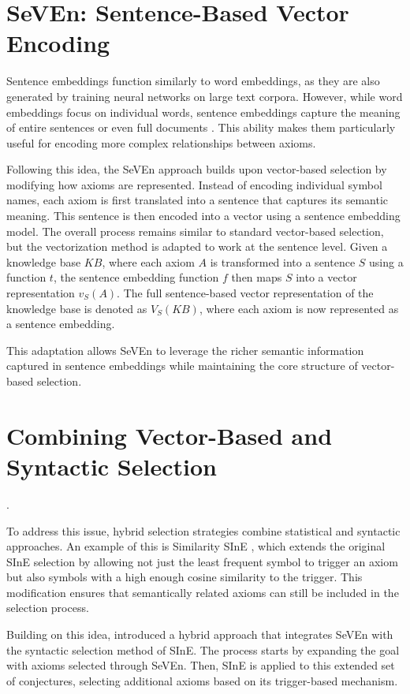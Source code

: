\documentclass[english,version-2020-11]{uzl-thesis}
\begin{document}
\section{SeVEn: Sentence-Based Vector Encoding}

Sentence embeddings function similarly to word embeddings, as they are also generated by training neural networks on large text corpora. However, while word embeddings focus on individual words, sentence embeddings capture the meaning of entire sentences or even full documents \cite{Kiros2015SkipThought}. This ability makes them particularly useful for encoding more complex relationships between axioms.

Following this idea, the SeVEn approach builds upon vector-based selection by modifying how axioms are represented. Instead of encoding individual symbol names, each axiom is first translated into a sentence that captures its semantic meaning. This sentence is then encoded into a vector using a sentence embedding model. The overall process remains similar to standard vector-based selection, but the vectorization method is adapted to work at the sentence level. Given a knowledge base \( KB \), where each axiom \( A \) is transformed into a sentence \( S \) using a function \( t \), the sentence embedding function \( f \) then maps \( S \) into a vector representation \( v_S(A) \). The full sentence-based vector representation of the knowledge base is denoted as \( V_S(KB) \), where each axiom is now represented as a sentence embedding.

This adaptation allows SeVEn to leverage the richer semantic information captured in sentence embeddings while maintaining the core structure of vector-based selection.

\section{Combining Vector-Based and Syntactic Selection}.

To address this issue, hybrid selection strategies combine statistical and syntactic approaches. An example of this is Similarity SInE \cite{Furbach2019WordEmbeddings}, which extends the original SInE selection by allowing not just the least frequent symbol to trigger an axiom but also symbols with a high enough cosine similarity to the trigger. This modification ensures that semantically related axioms can still be included in the selection process.

Building on this idea, \cite{Schon2023} introduced a hybrid approach that integrates SeVEn with the syntactic selection method of SInE. The process starts by expanding the goal with axioms selected through SeVEn. Then, SInE is applied to this extended set of conjectures, selecting additional axioms based on its trigger-based mechanism. 
\end{document}
